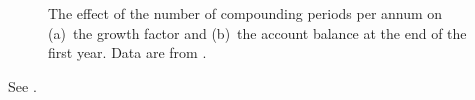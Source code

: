 \documentclass[a4paper,oneside,12pt]{article}
\begin{document}
\begin{problem}
{\begin{solution}
\begin{figure}[!htbp]
\centering
{}
\caption{%
  The effect of the number of compounding periods per annum on
  (a)~the growth factor and (b)~the account balance at the end of the
  first year.  Data are from
  .
}
\label{fig:exponential:e_balance_up_to_12_compounding}
\end{figure}

See .


\end{solution}}
\end{problem}
\end{document}
